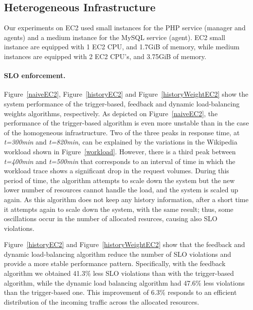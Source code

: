 


\subsection*{Heterogeneous Infrastructure}

Our experiments on EC2 used small instances for the PHP service (manager and agents) and  a medium instance for the MySQL service (agent). EC2 small instance are equipped with 1 EC2 CPU, and 1.7GiB of memory, while medium instances are equipped with 2 EC2 CPU's, and 3.75GiB of memory.


\paragraph{SLO enforcement.}
Figure~\ref{naiveEC2}, Figure~\ref{historyEC2} and Figure~\ref{historyWeightEC2} show the system performance of the trigger-based, feedback and dynamic load-balancing weights algorithms, respectively. As depicted on Figure~\ref{naiveEC2}, the performance of the trigger-based algorithm is even more unstable than in the case of the homogeneous infrastructure. Two of the three peaks in response time, at \emph{t=300min} and \emph{t=820min}, can be explained by the variations in the Wikipedia workload shown in Figure~\ref{workload}. However, there is a third peak between \emph{t=400min} and \emph{t=500min} that corresponds to an interval of time in which the workload trace shows a significant drop in the request volumes. During this period of time, the algorithm attempts to scale down the system but the new lower number of resources cannot handle the load, and the system is scaled up again. As this algorithm does not keep any history information, after a short time it attempts again to scale down the system, with the same result; thus, some oscillations occur in the number of allocated resurces, causing also SLO violations.   

Figure~\ref{historyEC2} and Figure~\ref{historyWeightEC2} show that the
feedback and dynamic load-balancing algorithm reduce the number of SLO 
violations and provide a more stable performance pattern. Specifically,
with the feedback algorithm  we obtained 41.3\% less SLO violations than
with the trigger-based algorithm, while the dynamic load balancing algorithm
had 47.6\% less violations than the trigger-based one. This improvement of 6.3\% responds to an efficient distribution of the incoming traffic across the allocated resources.

